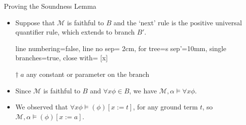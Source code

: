 \begin{frame}{Proving the Soundness Lemma}

	\begin{itemize}
	\itemsep=16pt
	
	\item Suppose that $\mathcal{M}$ is faithful to $B$ and the `next' rule is the positive universal quantifier rule, which extends to branch $B'$.

	\begin{center}

			\begin{prooftree}
			{
			line numbering=false,
			line no sep= 2cm,
			for tree={s sep'=10mm},
			single branches=true,
			close with=\xmark
			}
			[\forall x\phi [\phi\lbrack x:\!{=}\, a\rbrack^\dagger ] ]
			\end{prooftree}

	\bigskip
	$\dagger\; a$ any constant or parameter on the branch

	\end{center}

                        \item Since $\mathcal{M}$ is faithful to $B$
                          and $\forall x\phi\in B$, we have
                          $\mathcal{M},\alpha\vDash\forall x\phi$.

                          \item We observed that
                            $\forall x\phi\vDash (\phi)[x:=t]$, for
                            any ground term $t$, so
                            $\mathcal{M},\alpha\vDash (\phi)[x:=a]$. 
 
  \end{itemize}
  
\end{frame}

